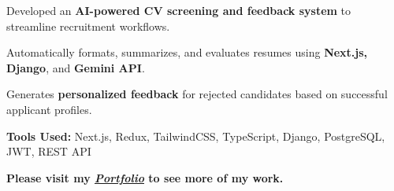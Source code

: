     \begin{onecolentry}
        \begin{highlights}
            \item Developed an \textbf{AI-powered CV screening and feedback system} to streamline recruitment workflows.
            \item Automatically formats, summarizes, and evaluates resumes using \textbf{Next.js, Django}, and \textbf{Gemini API}.
            \item Generates \textbf{personalized feedback} for rejected candidates based on successful applicant profiles.
            \vspace{0.1 cm}
            \item \textbf{Tools Used:} Next.js, Redux, TailwindCSS, TypeScript, Django, PostgreSQL, JWT, REST API
        \end{highlights}
    \end{onecolentry}
    \vspace{0.3 cm}

    \textbf{Please visit my \textit{\href{https://ehsankhan.me}{Portfolio}} to see more of my work.}